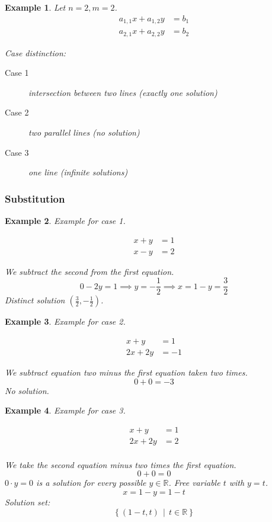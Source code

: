 \documentclass[a4paper,landscape,twocolumn]{article}
\newcommand\setdef[2]{\left\{#1\,\middle|\,#2\right\}}
\newtheorem{ex}{Example}[section]
\begin{document}
\begin{ex}
  Let $n = 2, m = 2$.
  \begin{align*}
    a_{1,1} x + a_{1,2} y &= b_1 \\
    a_{2,1} x + a_{2,2} y &= b_2
  \end{align*}

  Case distinction:
  \begin{description}
    \item[Case 1]
      intersection between two lines (exactly one solution)
    \item[Case 2]
      two parallel lines (no solution)
    \item[Case 3]
      one line (infinite solutions)
  \end{description}
\end{ex}

\subsubsection{Substitution}

\begin{ex}
  Example for case 1.

  \begin{align*}
    x + y &= 1 \\
    x - y &= 2
  \end{align*}

  We subtract the second from the first equation.
  \[ 0 - 2y = 1 \implies y = -\frac12 \implies x = 1 - y = \frac32 \]
  Distinct solution $(\frac32, -\frac12)$.
\end{ex}

\begin{ex}
  Example for case 2.

  \begin{align*}
     x +  y &= 1 \\
    2x + 2y &= -1
  \end{align*}

  We subtract equation two minus the first equation taken two times.
  \[ 0 + 0 = -3 \]
  No solution.
\end{ex}

\begin{ex}
  Example for case 3.

  \begin{align*}
    x + y &= 1 \\
    2x + 2y &= 2 \\
  \end{align*}

  We take the second equation minus two times the first equation.
  \[ 0 + 0 = 0 \]
  $0 \cdot y = 0$ is a solution for every possible $y \in \mathbb{R}$.
  Free variable $t$ with $y = t$.
  \[ x = 1 - y = 1 - t \]
  Solution set:
  \[ \setdef{(1 - t, t)}{t \in \mathbb{R}} \]
\end{ex}
\end{document}

